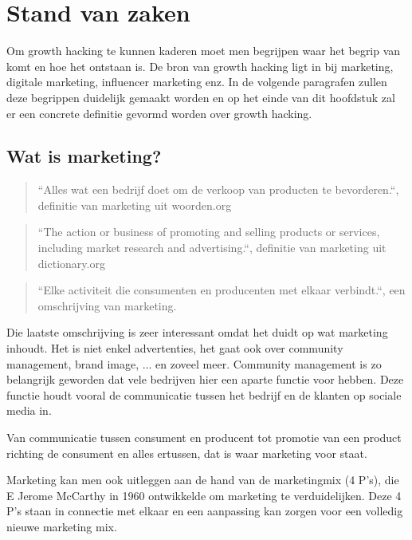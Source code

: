 \chapter{Stand van zaken} \label{ch:stand-van-zaken}


Om growth hacking te kunnen kaderen moet men begrijpen waar het begrip van komt en hoe het ontstaan is. De bron van growth hacking ligt in bij marketing, digitale marketing, influencer marketing enz. In de volgende paragrafen zullen deze begrippen duidelijk gemaakt worden en op het einde van dit hoofdstuk zal er een concrete definitie gevormd worden over growth hacking.

\section{Wat is marketing?} \label{sec:marketing}
\begin{quote}
	``Alles wat een bedrijf doet om de verkoop van producten te bevorderen.``, definitie van marketing uit woorden.org
\end{quote}
\begin{quote}
	``The action or business of promoting and selling products or services, including market research and advertising.``, definitie van marketing uit dictionary.org
\end{quote}
\begin{quote}
``Elke activiteit die consumenten en producenten met elkaar verbindt.``, een omschrijving van marketing.
\end{quote}

Die laatste omschrijving is zeer interessant omdat het duidt op wat marketing inhoudt. Het is niet enkel advertenties, het gaat ook over community management, brand image, ... en zoveel meer. Community management is zo belangrijk geworden dat vele bedrijven hier een aparte functie voor hebben. Deze functie houdt vooral de communicatie tussen het bedrijf en de klanten op sociale media in. 

Van communicatie tussen consument en producent tot promotie van een product richting de consument en alles ertussen, dat is waar marketing voor staat.

Marketing kan men ook uitleggen aan de hand van de marketingmix (4 P's), die E Jerome McCarthy in 1960 ontwikkelde om marketing te verduidelijken. Deze 4 P's staan in connectie met elkaar en een aanpassing kan zorgen voor een volledig nieuwe marketing mix.~\autocite{Forsey2019}

